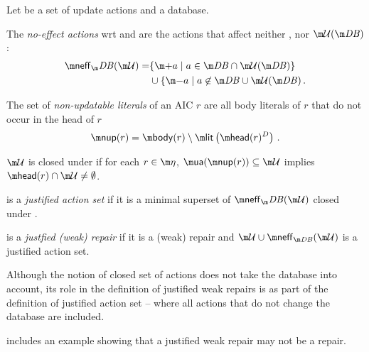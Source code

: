 \begin{definition}
  Let \UU be a set of update actions and \fulldb a database. 
  \begin{compactitem}
   \item The \emph{no-effect actions} wrt \db and \UU are the actions that affect neither \db, nor $\UU(\db)$: 
   \begin{align*}\neff_\db(\UU) =& \{\add a\mid a \in \db \cap \UU(\db)\} \\ &\cup \{\remove a \mid a \not\in \db \cup \UU(\db)\,.\end{align*}
   \item The set of \emph{non-updatable literals} of an AIC $r$ are all body literals of $r$ that do not occur in the head of $r$
   \[\nup(r) = \body(r) \setminus \litof\left(\head(r)^D\right)\,.\]
   \item $\UU$ is closed under \aics if for each $r\in \aics$, $\actof(\nup(r))\subseteq \UU$ implies $\head(r)\cap \UU\neq \emptyset$.
   \item \UU is a \emph{justified action set} if it is a minimal superset of $\neff_\db(\UU)$ closed under \aics.
   \item \UU is a \emph{justfied (weak) repair} if it is a (weak) repair and $\UU\cup \neff_{\db}(\UU)$ is a justified action set. 
  \end{compactitem}

\end{definition}
Although the notion of closed set of actions does not take the database into account, its role in the definition of justified weak repairs is as part of the definition of justified action set -- where all actions that do not change the database are included.

\citet{tplp/CaropreseT11} includes an example showing that a justified weak repair may not be a repair.


